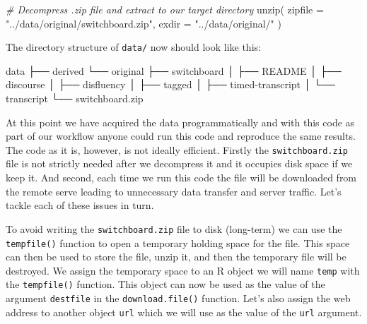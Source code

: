\documentclass[
  letterpaper,
]{latex/krantz}
\newenvironment{Shaded}{\begin{snugshade}}{\end{snugshade}}
\newcommand{\AttributeTok}[1]{\textcolor[rgb]{0.00,0.00,0.00}{#1}}
\newcommand{\CommentTok}[1]{\textcolor[rgb]{0.00,0.00,0.00}{\textit{#1}}}
\newcommand{\ExtensionTok}[1]{\textcolor[rgb]{0.00,0.00,0.00}{#1}}
\newcommand{\FunctionTok}[1]{\textcolor[rgb]{0.00,0.00,0.00}{#1}}
\newcommand{\NormalTok}[1]{\textcolor[rgb]{0.00,0.00,0.00}{#1}}
\newcommand{\StringTok}[1]{\textcolor[rgb]{0.00,0.00,0.00}{#1}}
\begin{document}
\begin{Shaded}
\begin{Highlighting}[]
\CommentTok{\# Decompress .zip file and extract to our target directory}
\FunctionTok{unzip}\NormalTok{(}
  \AttributeTok{zipfile =} \StringTok{"../data/original/switchboard.zip"}\NormalTok{,}
  \AttributeTok{exdir =} \StringTok{"../data/original/"}
\NormalTok{)}
\end{Highlighting}
\end{Shaded}

The directory structure of \texttt{data/} now should look like this:

\begin{Shaded}
\begin{Highlighting}[]
\ExtensionTok{data}
\ExtensionTok{├──}\NormalTok{ derived}
\ExtensionTok{└──}\NormalTok{ original}
    \ExtensionTok{├──}\NormalTok{ switchboard}
    \ExtensionTok{│}\NormalTok{   ├── README}
    \ExtensionTok{│}\NormalTok{   ├── discourse}
    \ExtensionTok{│}\NormalTok{   ├── disfluency}
    \ExtensionTok{│}\NormalTok{   ├── tagged}
    \ExtensionTok{│}\NormalTok{   ├── timed{-}transcript}
    \ExtensionTok{│}\NormalTok{   └── transcript}
    \ExtensionTok{└──}\NormalTok{ switchboard.zip}
\end{Highlighting}
\end{Shaded}

At this point we have acquired the data programmatically and with this
code as part of our workflow anyone could run this code and reproduce
the same results. The code as it is, however, is not ideally efficient.
Firstly the \texttt{switchboard.zip} file is not strictly needed after
we decompress it and it occupies disk space if we keep it. And second,
each time we run this code the file will be downloaded from the remote
serve leading to unnecessary data transfer and server traffic. Let's
tackle each of these issues in turn.

To avoid writing the \texttt{switchboard.zip} file to disk (long-term)
we can use the \texttt{tempfile()} function to open a temporary holding
space for the file. This space can then be used to store the file, unzip
it, and then the temporary file will be destroyed. We assign the
temporary space to an R object we will name \texttt{temp} with the
\texttt{tempfile()} function. This object can now be used as the value
of the argument \texttt{destfile} in the \texttt{download.file()}
function. Let's also assign the web address to another object
\texttt{url} which we will use as the value of the \texttt{url}
argument.
\end{document}
